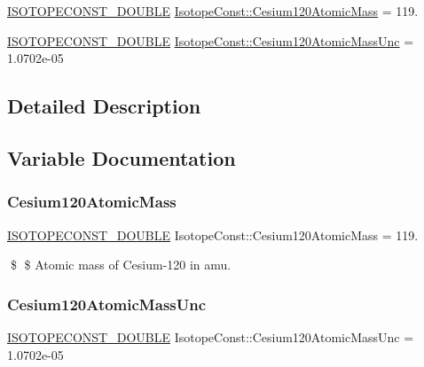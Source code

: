 \begin{DoxyCompactItemize}
\item 
\mbox{\hyperlink{group___isotope_const-_macros_ga8f45a7272ce02c0b4c65c44636ed719a}{I\+S\+O\+T\+O\+P\+E\+C\+O\+N\+S\+T\+\_\+\+D\+O\+U\+B\+LE}} \mbox{\hyperlink{group___isotope_const-_cesium-_cs120_gaf465e0db48351ee5d0f32c63f847bd3d}{Isotope\+Const\+::\+Cesium120\+Atomic\+Mass}} = 119.
\item 
\mbox{\hyperlink{group___isotope_const-_macros_ga8f45a7272ce02c0b4c65c44636ed719a}{I\+S\+O\+T\+O\+P\+E\+C\+O\+N\+S\+T\+\_\+\+D\+O\+U\+B\+LE}} \mbox{\hyperlink{group___isotope_const-_cesium-_cs120_ga57f816b436716d91f95b769bc02494ef}{Isotope\+Const\+::\+Cesium120\+Atomic\+Mass\+Unc}} = 1.\+0702e-\/05
\end{DoxyCompactItemize}


\subsection{Detailed Description}


\subsection{Variable Documentation}
\mbox{\label{group___isotope_const-_cesium-_cs120_gaf465e0db48351ee5d0f32c63f847bd3d}} 
\subsubsection{\texorpdfstring{Cesium120\+Atomic\+Mass}{Cesium120AtomicMass}}
{\footnotesize\ttfamily \mbox{\hyperlink{group___isotope_const-_macros_ga8f45a7272ce02c0b4c65c44636ed719a}{I\+S\+O\+T\+O\+P\+E\+C\+O\+N\+S\+T\+\_\+\+D\+O\+U\+B\+LE}} Isotope\+Const\+::\+Cesium120\+Atomic\+Mass = 119.}

\$ \$ Atomic mass of Cesium-\/120 in amu. \mbox{\label{group___isotope_const-_cesium-_cs120_ga57f816b436716d91f95b769bc02494ef}} 
\subsubsection{\texorpdfstring{Cesium120\+Atomic\+Mass\+Unc}{Cesium120AtomicMassUnc}}
{\footnotesize\ttfamily \mbox{\hyperlink{group___isotope_const-_macros_ga8f45a7272ce02c0b4c65c44636ed719a}{I\+S\+O\+T\+O\+P\+E\+C\+O\+N\+S\+T\+\_\+\+D\+O\+U\+B\+LE}} Isotope\+Const\+::\+Cesium120\+Atomic\+Mass\+Unc = 1.\+0702e-\/05}

